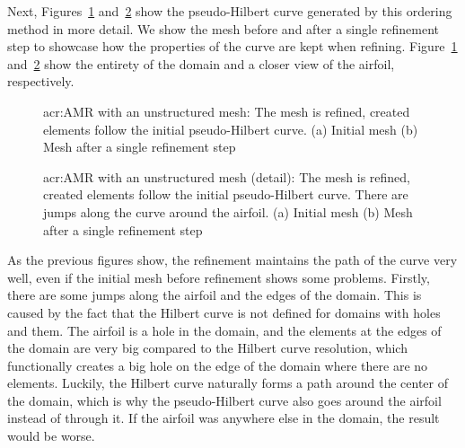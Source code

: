 Next, Figures~\ref{fig:mesh_P0_adaptivity_far} and~\ref{fig:mesh_P0_adaptivity_near} show the
pseudo-Hilbert curve generated by this ordering method in more detail. We show the mesh before and
after a single refinement step to showcase how the properties of the curve are kept when refining.
Figure~\ref{fig:mesh_P0_adaptivity_far} and~\ref{fig:mesh_P0_adaptivity_near} show the entirety of
the domain and a closer view of the airfoil, respectively.

\begin{figure}[H]
    \centering
    \caption{\Acrlong{acr:AMR} with an unstructured mesh: The mesh is refined, created elements follow the initial pseudo-Hilbert curve. (a) Initial mesh (b) Mesh after a single refinement step}\label{fig:mesh_P0_adaptivity_far}
\end{figure}

\begin{figure}[H]
    \centering
    \caption{\Acrlong{acr:AMR} with an unstructured mesh (detail): The mesh is refined, created elements follow the initial pseudo-Hilbert curve. There are jumps along the curve around the airfoil. (a) Initial mesh (b) Mesh after a single refinement step}\label{fig:mesh_P0_adaptivity_near}
\end{figure}

As the previous figures show, the refinement maintains the path of the curve very well, even if the
initial mesh before refinement shows some problems. Firstly, there are some jumps along the airfoil
and the edges of the domain. This is caused by the fact that the Hilbert curve is not defined for
domains with holes and them. The airfoil is a hole in the domain, and the elements at the edges of
the domain are very big compared to the Hilbert curve resolution, which functionally creates a big
hole on the edge of the domain where there are no elements. Luckily, the Hilbert curve naturally
forms a path around the center of the domain, which is why the pseudo-Hilbert curve also goes around
the airfoil instead of through it. If the airfoil was anywhere else in the domain, the result would
be worse.


